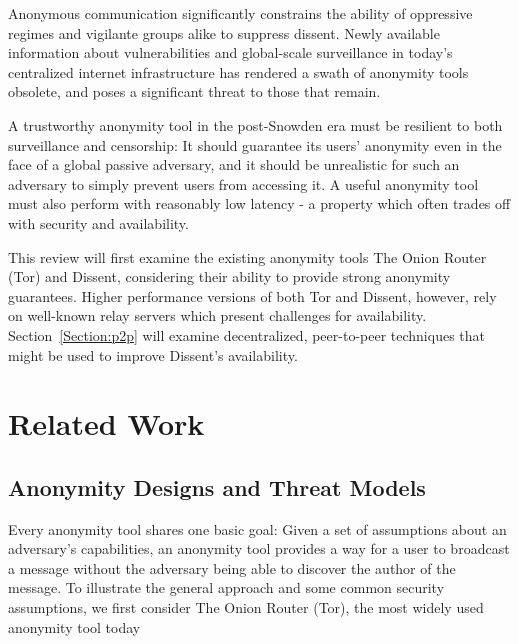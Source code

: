 Anonymous communication significantly constrains the ability of oppressive
regimes and vigilante groups alike to suppress dissent. Newly available
information about vulnerabilities and global-scale surveillance in today's
centralized internet infrastructure has rendered a swath of anonymity tools
obsolete, and poses a significant threat to those that remain.

A trustworthy anonymity tool in the post-Snowden era must be resilient to both
surveillance and censorship: It should guarantee its users' anonymity even in
the face of a global passive adversary, and it should be unrealistic for such an
adversary to simply prevent users from accessing it. A useful anonymity tool
must also perform with reasonably low latency - a property which often trades
off with security and availability.

This review will first examine the existing anonymity tools The Onion Router
(Tor) and Dissent, considering their ability to provide strong anonymity
guarantees. Higher performance versions of both Tor and Dissent, however, rely
on well-known relay servers which present challenges for availability.
Section~\ref{Section:p2p} will examine decentralized, peer-to-peer techniques
that might be used to improve Dissent's availability.
\section{Related Work}
\subsection{Anonymity Designs and Threat Models}
\label{subsection:ExistingAnonymity}
  Every anonymity tool shares one basic goal: Given a set of assumptions about
  an adversary's capabilities, an anonymity tool provides a way for a user to
  broadcast a message without the adversary being able to discover the author of
  the message.
  To illustrate the general approach and some common security assumptions, we
  first consider The Onion Router (Tor), the most widely used anonymity tool
  today\cite{ford_hiding_2014}

